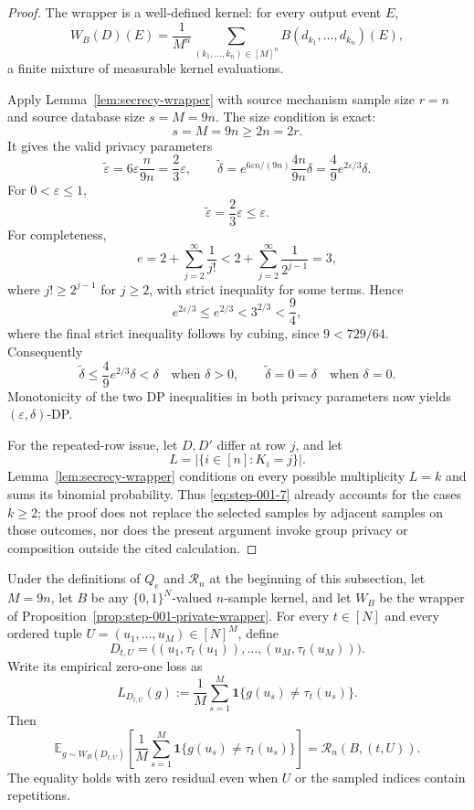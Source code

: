 \begin{proof}

The wrapper is a well-defined kernel: for every output event \(E\),
\[
W_B(D)(E)=\frac1{M^n}
\sum_{(k_1,\ldots,k_n)\in[M]^n}
B(d_{k_1},\ldots,d_{k_n})(E),
\tag{5}\label{eq:step-001-5}
\]
a finite mixture of measurable kernel evaluations.

Apply Lemma~\ref{lem:secrecy-wrapper} with source mechanism sample size \(r=n\) and source database size \(s=M=9n\). The size condition is exact:
\[
s=M=9n\ge2n=2r.
\tag{6}\label{eq:step-001-6}
\]
It gives the valid privacy parameters
\[
\widetilde\varepsilon
=6\varepsilon\frac n{9n}=\frac23\varepsilon,
\qquad
\widetilde\delta
=e^{6\varepsilon n/(9n)}\frac{4n}{9n}\delta
=\frac49e^{2\varepsilon/3}\delta.
\tag{7}\label{eq:step-001-7}
\]
For \(0<\varepsilon\le 1\),
\[
\widetilde\varepsilon=\frac23\varepsilon\le\varepsilon.
\tag{8}\label{eq:step-001-8}
\]
For completeness,
\[
e=2+\sum_{j=2}^{\infty}\frac1{j!}
<2+\sum_{j=2}^{\infty}\frac1{2^{j-1}}=3,
\tag{9a}\label{eq:step-001-9a}
\]
where \(j!\ge 2^{j-1}\) for \(j\ge 2\), with strict inequality for some terms. Hence
\[
e^{2\varepsilon/3}\le e^{2/3}<3^{2/3}<\frac94,
\]
where the final strict inequality follows by cubing, since \(9<729/64\). Consequently
\[
\widetilde\delta
\le\frac49 e^{2/3}\delta
<\delta
\quad\text{when }\delta>0,
\qquad
\widetilde\delta=0=\delta
\quad\text{when }\delta=0.
\tag{9}\label{eq:step-001-9}
\]
Monotonicity of the two DP inequalities in both privacy parameters now yields \((\varepsilon,\delta)\)-DP.

For the repeated-row issue, let \(D,D'\) differ at row \(j\), and let
\[
L=|\{i\in[n]:K_i=j\}|.
\]
Lemma~\ref{lem:secrecy-wrapper} conditions on every possible multiplicity \(L=k\) and sums its binomial probability. Thus \eqref{eq:step-001-7} already accounts for the cases \(k\ge 2\); the proof does not replace the selected samples by adjacent samples on those outcomes, nor does the present argument invoke group privacy or composition outside the cited calculation.

\end{proof}


\begin{lemma}
\label{lem:step-001-risk-identity}

Under the definitions of \(Q_e\) and \(\mathcal R_n\) at the beginning of this subsection, let \(M=9n\), let \(B\) be any \(\{0,1\}^N\)-valued \(n\)-sample kernel, and let \(W_B\) be the wrapper of Proposition~\ref{prop:step-001-private-wrapper}. For every \(t \in [N]\) and every ordered tuple \(U=(u_1,\ldots,u_M) \in [N]^M\), define
\[
D_{t,U}=\bigl((u_1,\tau_t(u_1)),\ldots,
(u_M,\tau_t(u_M))\bigr).
\tag{10}\label{eq:step-001-10}
\]
Write its empirical zero-one loss as
\[
L_{D_{t,U}}(g)
:=\frac1M\sum_{s=1}^M
\mathbf 1\{g(u_s)\ne\tau_t(u_s)\}.
\tag{10a}\label{eq:step-001-10a}
\]
Then
\[
\mathbb E_{g\sim W_B(D_{t,U})}
\left[\frac1M\sum_{s=1}^M
\mathbf 1\{g(u_s)\ne\tau_t(u_s)\}\right]
=\mathcal R_n(B,(t,U)).
\tag{11}\label{eq:step-001-11}
\]
The equality holds with zero residual even when \(U\) or the sampled indices contain repetitions.

\end{lemma}

